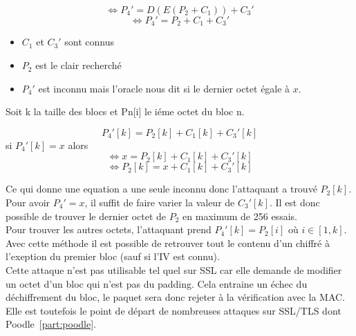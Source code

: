 \[\Longleftrightarrow P_4' = D(E(P_2 + C_1)) + C_3'\]
\[\Longleftrightarrow P_4' = P_2 + C_1 + C_3'\]
\begin{itemize}
\item $C_1$ et $C_3'$ sont connus
\item $P_2$ est le clair recherché
\item $P_4'$ est inconnu mais l'oracle nous dit si le dernier octet égale à $x$.
\end{itemize}
Soit k la taille des blocs et Pn[i] le iéme octet du bloc n.

\[P_4'[k] = P_2[k] + C_1[k] + C_3'[k]\] si $P_4'[k] = x$ alors
\[\Longleftrightarrow x = P_2[k] + C_1[k] + C_3'[k]\]
\[\Longleftrightarrow P_2[k] = x + C_1[k] + C_3'[k]\]

Ce qui donne une equation a une seule inconnu donc l'attaquant a trouvé $P_2[k]$.
Pour avoir $P_4' = x$, il suffit de faire varier la valeur de $C_3'[k]$. Il est donc
possible de trouver le dernier octet de $P_2$ en maximum de 256 essais.\\

Pour trouver les autres octets, l'attaquant prend $P_4'[k] = P_2[i]$ où $i \in [1,k]$.
Avec cette méthode il est possible de retrouver tout le contenu d'un chiffré à
l'exeption du premier bloc (sauf si l'IV est connu).\\

Cette attaque n'est pas utilisable tel quel sur SSL car elle demande de modifier un octet
d'un bloc qui n'est pas du padding. Cela entraine un échec du déchiffrement du bloc, le
paquet sera donc rejeter à la vérification avec la MAC. Elle est toutefois le point de
départ de nombreuses attaques sur SSL/TLS dont Poodle~\ref{part:poodle}.

